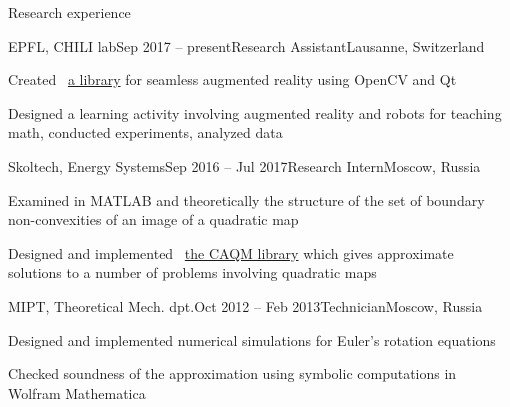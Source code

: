 \documentclass{resume} %
\begin{document}
\begin{rSection}{Research experience}
	\begin{rSubsection}{EPFL, CHILI lab}{Sep 2017 -- present}{Research Assistant}{Lausanne, Switzerland}
		\item Created \faExternalLink~\href{https://github.com/chili-epfl/qml-ar}{a library} for seamless augmented reality using OpenCV and Qt %
		\item Designed a learning activity involving augmented reality and robots for teaching math, conducted experiments, analyzed data %
	\end{rSubsection}
	
	\begin{rSubsection}{Skoltech, Energy Systems}{Sep 2016 -- Jul 2017}{Research Intern}{Moscow, Russia}
		\item Examined in MATLAB and theoretically the structure of the set of boundary non-convexities of an image of a quadratic map
		\item Designed and implemented \faExternalLink~\href{https://github.com/sergeivolodin/CAQM}{the CAQM library} which gives approximate solutions to a number of problems involving quadratic maps
	\end{rSubsection}
	
	
	\begin{rSubsection}{MIPT, Theoretical Mech. dpt.}{Oct 2012 -- Feb 2013}{Technician}{Moscow, Russia}
		\item Designed and implemented numerical simulations for Euler's rotation equations
		\item Checked soundness of the approximation using symbolic computations in Wolfram Mathematica
	\end{rSubsection}
\end{rSection}
\end{document}

